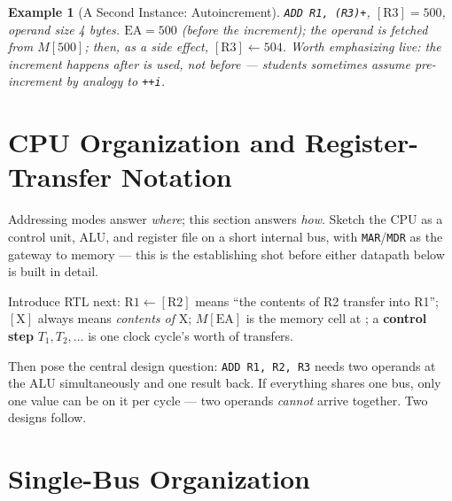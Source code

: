 \documentclass[11pt]{article}
\newtheorem{example}{Example}[section]
\begin{document}
\begin{example}[A Second Instance: Autoincrement]
\texttt{ADD R1, (R3)+}, $[\text{R3}]=500$, operand size 4 bytes. $\text{EA} = 500$ (\emph{before} the increment); the operand is fetched from $M[500]$; then, as a side effect, $[\text{R3}] \gets 504$. Worth emphasizing live: the increment happens \emph{after}  is used, not before --- students sometimes assume pre-increment by analogy to \texttt{++i}.
\end{example}

\section{CPU Organization and Register-Transfer Notation}

Addressing modes answer \emph{where}; this section answers \emph{how}. Sketch the CPU as a control unit, ALU, and register file on a short internal bus, with \texttt{MAR}/\texttt{MDR} as the gateway to memory --- this is the establishing shot before either datapath below is built in detail.

Introduce RTL next: $\text{R1} \gets [\text{R2}]$ means ``the contents of R2 transfer into R1''; $[\text{X}]$ always means \emph{contents of} X; $M[\text{EA}]$ is the memory cell at ; a \textbf{control step} $T_1, T_2, \dots$ is one clock cycle's worth of transfers.

Then pose the central design question: \texttt{ADD R1, R2, R3} needs two operands at the ALU simultaneously and one result back. If everything shares one bus, only one value can be on it per cycle --- two operands \emph{cannot} arrive together. Two designs follow.

\section{Single-Bus Organization}
\end{document}
